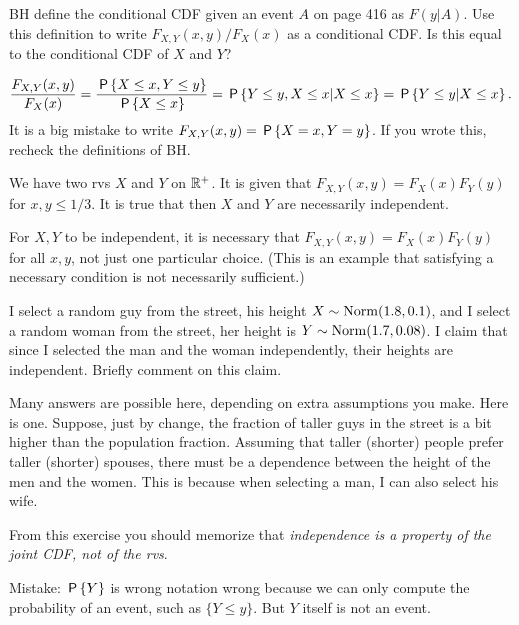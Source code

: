 \begin{exercise}
BH define the conditional CDF given an event $A$ on page 416 as $F(y|A)$.
Use this definition to write $F_{X,Y}(x,y)/F_{X}(x)$ as a conditional CDF.
Is this equal to the conditional CDF of $X$ and $Y$?
\begin{solution}
\begin{align}
\frac{F_{X,Y}(x,y)}{F_{X}(x)} = \frac{\P{X\leq x, Y\leq y}}{\P{X\leq x}}
  = \P{Y\leq y, X\leq x|X\leq x} = \P{Y\leq y|X\leq x}.
\end{align}
It is a big mistake to write $F_{X,Y}(x,y) = \P{X=x, Y=y}$. If you wrote this, recheck the definitions of BH.
\end{solution}
\end{exercise}


\begin{exercise}
We have two rvs $X$ and $Y$ on $\R^{+}$. It is given that $F_{X,Y}(x,y) = F_X(x)F_Y(y)$ for $x,y \leq 1/3$. It is true that then  $X$ and $Y$ are necessarily independent.
\begin{solution}
For $X, Y$ to be independent, it is necessary that  $F_{X,Y}(x,y) = F_X(x)F_Y(y)$ for all $x,y$, not just one particular choice. (This is an example that satisfying a necessary condition is not necessarily sufficient.)
\end{solution}
\end{exercise}

\begin{exercise}
I select a random guy from the street, his height $X\sim\Norm{1.8, 0.1}$, and I select a random woman from the street, her height is $Y\sim\Norm{1.7, 0.08}$.
I claim that since I selected the man and the woman independently, their heights are independent.
Briefly comment on this claim.


\begin{solution}
  Many answers are possible here, depending on extra assumptions you make.
  Here is one.
  Suppose, just by change, the fraction of taller guys in the street is a bit higher than the population fraction.
  Assuming that taller (shorter) people prefer taller (shorter) spouses, there must be a dependence between the height of the men and the women. This is because when selecting a man, I can also select his wife.

From this exercise you should memorize that \emph{independence is a property of the joint CDF, not of the rvs}.

Mistake:   $\P{Y}$ is wrong notation wrong because we can only compute the probability of an event, such as $\{Y\leq y\}$. But $Y$ itself is not an event. \end{solution}
\end{exercise}


